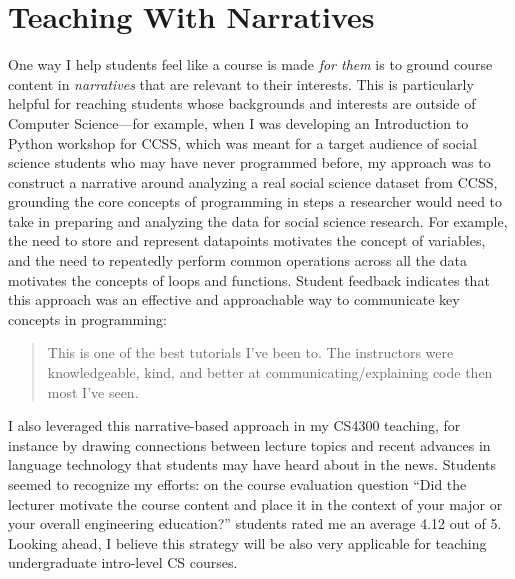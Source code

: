 \documentclass[12pt,letterpaper]{article}
\begin{document}
\section{Teaching With Narratives}
One way I help students feel like a course is made \emph{for them} is to ground course content in \emph{narratives} that are relevant to their interests.
This is particularly helpful for reaching students whose backgrounds and interests are outside of Computer Science---for example, when I was developing an Introduction to Python workshop for CCSS, which was meant for a target audience of social science students who may have never programmed before, my approach was to construct a narrative around analyzing a real social science dataset from CCSS, grounding the core concepts of programming in steps a researcher would need to take in preparing and analyzing the data for social science research.
For example, the need to store and represent datapoints motivates the concept of variables, and the need to repeatedly perform common operations across all the data motivates the concepts of loops and functions.
Student feedback indicates that this approach was an effective and approachable way to communicate key concepts in programming:
\begin{quote}
    This is one of the best tutorials I've been to. The instructors were knowledgeable, kind, and better at communicating/explaining code then most I've seen.
\end{quote}

I also leveraged this narrative-based approach in my CS4300 teaching, for instance by drawing connections between lecture topics and recent advances in language technology that students may have heard about in the news.
Students seemed to recognize my efforts: on the course evaluation question ``Did the lecturer motivate the course content
and place it in the context of your major or your overall engineering
education?'' students rated me an average 4.12 out of 5.
Looking ahead, I believe this strategy will be also very applicable for teaching undergraduate intro-level CS courses.
\narrativeendsent
\end{document}
